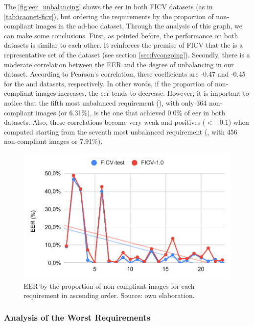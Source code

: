 The \autoref{fig:eer_unbalancing} shows the \acs{eer} in both FICV datasets (as in \autoref{tab:icaonet-ficv}), but ordering the requirements by the proportion of non-compliant images in the ad-hoc dataset. Through the analysis of this graph, we can make some conclusions. First, as pointed before, the performance on both datasets is similar to each other. It reinforces the premise of FICV that the \ficvtest is a representative set of the \ficvofficial dataset (see section \ref{sec:fvcongoing}). Secondly, there is a moderate correlation between the EER and the degree of unbalancing in our dataset. According to Pearson's correlation, these coefficients are -0.47 and -0.45 for the \ficvtest and \ficvofficial datasets, respectively. In other words, if the proportion of non-compliant images increases, the \acs{eer} tends to decrease. However, it is important to notice that the fifth most unbalanced requirement (\veiloverface), with only 364 non-compliant images (or 6.31\%), is the one that achieved 0.0\% of \acs{eer} in both datasets. Also, these correlations become very weak and positives ($< +0.1$) when computed starting from the seventh most unbalanced requirement (\toodarklight, with 456 non-compliant images or 7.91\%).

\begin{figure}[ht]
\centering
\includegraphics[width=0.8\linewidth]{images/graphs/eer_unbalancing.pdf}
\caption{EER by the proportion of non-compliant images for each requirement in ascending order. Source: own elaboration.}
\label{fig:eer_unbalancing}
\end{figure}

\subsubsection{Analysis of the Worst Requirements}


